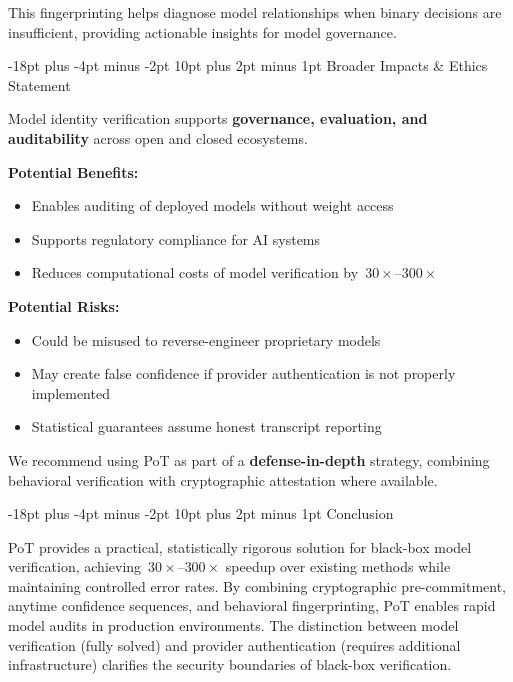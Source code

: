 \documentclass[11pt]{article}
\makeatletter
\renewcommand\section{\@startsection{section}{1}{\z@}%
  {-18pt plus -4pt minus -2pt}%
  {10pt plus 2pt minus 1pt}%
  {\normalfont\Large\bfseries}}
\makeatother
\begin{document}
This fingerprinting helps diagnose model relationships when binary decisions are insufficient, providing actionable insights for model governance.

\section{Broader Impacts \& Ethics Statement}

Model identity verification supports \textbf{governance, evaluation, and auditability} across open and closed ecosystems.

\textbf{Potential Benefits:}
\begin{itemize}
\item Enables auditing of deployed models without weight access
\item Supports regulatory compliance for AI systems
\item Reduces computational costs of model verification by~$30{\times}$--$300{\times}$
\end{itemize}

\textbf{Potential Risks:}
\begin{itemize}
\item Could be misused to reverse-engineer proprietary models
\item May create false confidence if provider authentication is not properly implemented
\item Statistical guarantees assume honest transcript reporting
\end{itemize}

We recommend using PoT as part of a \textbf{defense-in-depth} strategy, combining behavioral verification with cryptographic attestation where available.

\section{Conclusion}

PoT provides a practical, statistically rigorous solution for black-box model verification, achieving~$30{\times}$--$300{\times}$ speedup over existing methods while maintaining controlled error rates. By combining cryptographic pre-commitment, anytime confidence sequences, and behavioral fingerprinting, PoT enables rapid model audits in production environments. The distinction between model verification (fully solved) and provider authentication (requires additional infrastructure) clarifies the security boundaries of black-box verification.



\end{document}
